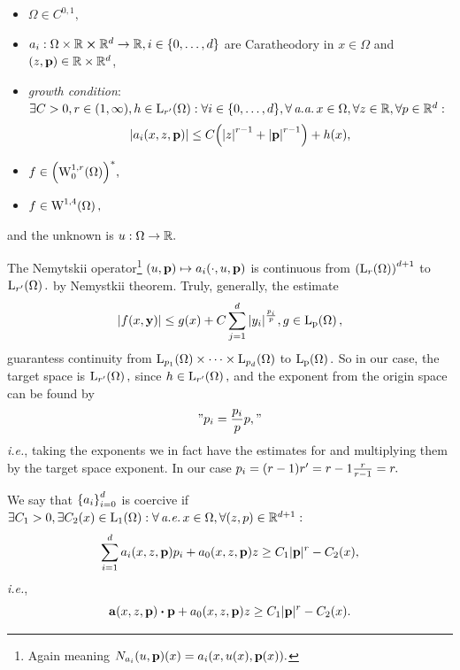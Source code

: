 \documentclass{article}
\begin{document}
\begin{itemize}
	\item $\Omega \in C^{0,1},$
	\item $a_i: \Omega \times {\mathbb R} \cross {\mathbb R}^d \to {\mathbb R}, i \in \qty{0,\dots,d}$ are Caratheodory in $x \in \Omega$ and $\qty(z, \vb{p}) \in {\mathbb R} \times {\mathbb R}^d$,
		\item \textit{growth condition}: $\exists C>0, r \in (1,\infty), h \in \LpSet[r']{\Omega}: \forall i \in \qty{0, \dots, d}, \forall  \, \text{\textit{a.a.}} \, x\in \Omega, \forall z \in \R, \forall p \in \R^d:$
			\[
				\abs{a_i\qty(x,z,\vb{p})} \leq C\qty(\abs{z}^{r-1}+\abs{\vb{p}}^{r-1})+h(x),
			\]
		\item $f \in \qty(\WkpzeroSet[1][r]{\Omega})^{*},$
		\item $f \in \WkpSet[1][4]{\Omega},$
\end{itemize}
and the unknown is $u: \Omega \to {\mathbb R}.$
\begin{remark}
	The Nemytskii operator\footnote{Again meaning $N_{a_i}(u,\vb{p})(x) = a_i\qty(x, u(x), \vb{p}(x)).$} $(u,\vb{p}) \mapsto a_i\qty(\cdot, u, \vb{p})$ is continuous from $\qty(\LpSet[r]{\Omega})^{d+1}$ to $\LpSet[r']{\Omega}.$ by Nemystkii theorem. Truly, generally, the estimate
	\[
		\abs{f(x,\vb{y})} \leq g(x) + C \sum_{j=1}^d \abs{y_i}^{\frac{p_i}{p}}, g \in \LpSet{\Omega},
	\]
	guarantess continuity from $\LpSet[p_1]{\Omega} \times \dots \times \LpSet[p_d]{\Omega}$ to $\LpSet{\Omega}.$ So in our case, the target space is $\LpSet[r']{\Omega},$ since $h \in \LpSet[r']{\Omega},$ and the exponent from the origin space can be found by
	\[
		"p_i = \frac{p_i}{p} p,"
	\]
	\textit{i.e.}, taking the exponents we in fact have the estimates for and multiplying them by the target space exponent. In our case $p_i = \qty(r-1)r' = r-1 \frac{r}{r-1} = r.$ 
\end{remark}


\begin{definition}[Coercivity]
	We say that $\qty{a_i}_{i=0}^d$ is coercive if $\exists C_1 > 0, \exists C_2(x) \in \LpSet[1]{\Omega}: \forall \, \text{\textit{a.e.}} \, x \in \Omega, \forall (z,p) \in \R^{d+1}:$
	\[
		\sum_{i=1}^d a_i\qty(x,z,\vb{p})p_i + a_0\qty(x,z,\vb{p})z \geq C_1 |\vb{p}|^r-C_2(x), 
	\]
	\textit{i.e.},
	\[
		\vb{a}\qty(x,z,\vb{p}) \vdot \vb{p} + a_0\qty(x,z,\vb{p})z \geq C_1 |\vb{p}|^r - C_2(x).
	\]

\end{definition}
\end{document}
